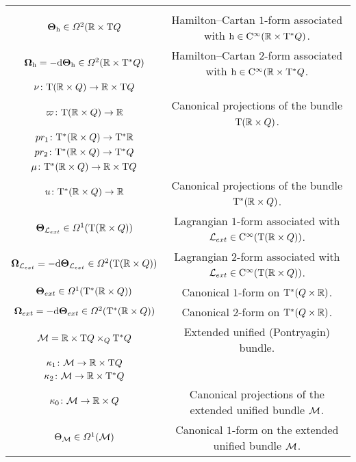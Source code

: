 \documentclass[12pt]{report}
\def\df{{\mit\Omega}}
\def\Lag{{\cal L}}
\def\d{{\rm d}}
\def\Real{\mathbb{R}}
\def\Tan{{\rm T}}
\def\Cinfty{{\rm C}^\infty}
\begin{document}
\begin{center}
{\small
\begin{tabular}{|c|c|}
\hline
 & \\
 $\mbox{\boldmath $\Theta$}_{\rm h}\in\df^2(\Real\times\Tan Q$ &
Hamilton--Cartan $1$-form associated with ${\rm h}\in\Cinfty(\Real\times\Tan^*Q)$. \\
$\mbox{\boldmath $\Omega$}_{\rm h}=-\d\mbox{\boldmath $\Theta$}_{\rm h}\in\df^2(\Real\times\Tan^*Q)$ &
Hamilton--Cartan $2$-form associated with ${\rm h}\in\Cinfty(\Real\times\Tan^*Q$. \\
$\nu\colon\Tan(\Real \times Q)\rightarrow \Real\times\Tan Q$ & \\
$\varpi\colon\Tan(\Real \times Q)\rightarrow \Real$ &
Canonical projections of the bundle $\Tan(\Real \times Q)$. \\
$pr_1\colon\Tan^*(\Real \times Q)\rightarrow \Tan^*\Real$ & \\
$pr_2\colon\Tan^*(\Real \times Q)\rightarrow\Tan^*Q$ & \\
$\mu\colon\Tan^*(\Real \times Q)\rightarrow\Real\times\Tan Q$ & \\
$u\colon\Tan^*(\Real \times Q)\rightarrow\Real$ & 
Canonical projections of the bundle $\Tan^*(\Real\times Q)$. \\
 ${\mathbf \Theta}_{{\cal L}_{ext}}\in\df^1(\Tan (\Real\times Q))$ &
Lagrangian $1$-form associated with $\Lag_{ext}\in\Cinfty(\Tan(\Real\times Q))$. \\
${\mathbf \Omega}_{{\cal L}_{ext}}=-\d{\mathbf \Theta}_{{\cal L}_{ext}}\in\df^2(\Tan (\Real\times Q))$ &
Lagrangian $2$-form associated with $\Lag_{ext}\in\Cinfty(\Tan(\Real\times Q))$. \\
 ${\mathbf \Theta}_{ext}\in\df^1(\Tan^*(\Real\times Q))$ &
Canonical $1$-form on $\Tan^*(Q\times\Real)$. \\
$\mbox{\boldmath $\Omega$}_{ext}=-\d\mbox{\boldmath $\Theta$}_{ext}\in\df^2(\Tan^*(\Real\times Q))$  &
Canonical $2$-form on $\Tan^*(Q\times\Real)$. \\
 ${\cal M}=\Real\times\Tan Q\times_Q\Tan^*Q$ &
Extended unified (Pontryagin) bundle. \\ 
$\kappa_1\colon{\cal M}\to\Real\times\Tan Q$ & \\
$\kappa_2\colon{\cal M}\to\Real\times\Tan^*Q$ & \\
$\kappa_0\colon{\cal M}\to\Real\times Q$ &
Canonical projections of the extended unified  bundle ${\cal M}$. \\ 
 $\Theta_{\cal M}\in\df^1({\cal M})$ &
Canonical $1$-form on the extended unified bundle ${\cal M}$. \\ 

\end{tabular}}
\end{center}
\end{document}
